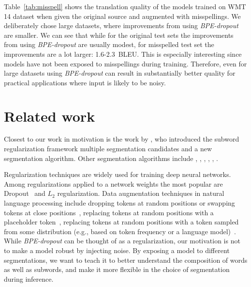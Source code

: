 \documentclass[11pt,a4paper]{article}
\begin{document}
Table~\ref{tab:misspell} shows the translation quality of the models trained on WMT 14 dataset when given the original source and augmented with misspellings. We deliberately chose large datasets, where improvements from using \textit{BPE-dropout} are smaller. We can see that while for the original test sets the improvements from using \textit{BPE-dropout} are usually modest, for misspelled test set the improvements are a lot larger: 1.6-2.3~BLEU. This is especially interesting since models have not been exposed to misspellings during training. Therefore, even for large datasets using \textit{BPE-dropout} can result in substantially better quality for practical applications where input is likely to be noisy.

 
\section{Related work}


Closest to our work in motivation is the work by \citet{sentencepiece}, who introduced the subword regularization framework multiple segmentation candidates 
and a new segmentation algorithm. 
Other segmentation  algorithms include \citet{creutz2006morfessor}, \citet{schuster2012japanese}, \citet{chitnis-denero-2015-variable}, \citet{kunchukuttan-bhattacharyya-2016-orthographic}, \citet{wu2018finding}, \citet{banerjee-bhattacharyya-2018-meaningless}.

Regularization techniques are widely used for training deep neural networks. Among regularizations applied to a network weights the most popular are Dropout~\cite{srivastava2014dropout} and $L_2$ regularization. Data augmentation techniques in natural language processing include dropping  tokens at random positions or swapping tokens at close positions~\cite{iyyer-etal-2015-deep,artetxe-etal-2018-unsupervised,lample2018unsupervised}, replacing tokens at random positions with a placeholder token~\cite{xie2017datanoising}, replacing tokens at random positions with a token sampled from some distribution (e.g., based on token frequency or a language model)~\cite{fadaee-etal-2017-data,xie2017datanoising,kobayashi-2018-contextual}. While \textit{BPE-dropout} can be thought of as a regularization, our motivation is not to make a model robust by injecting noise. By exposing a model to different segmentations, we want to teach it to better understand the composition of words as well as subwords, and make it more flexible in the choice of segmentation during inference.
\end{document}
